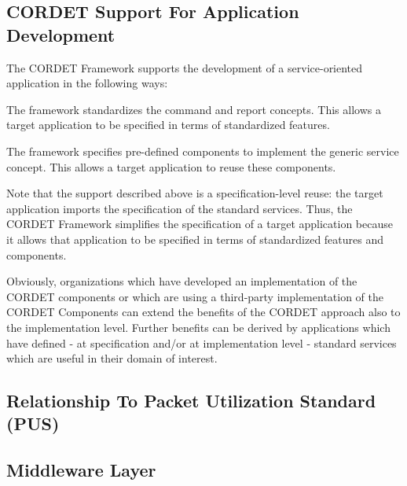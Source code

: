 \documentclass[a4paper,10pt]{article}
\newenvironment{fw_enumerate}					%
{\begin{enumerate}
  \setlength{\itemsep}{1mm}
  \setlength{\parskip}{0pt}
  \setlength{\parsep}{0pt}}
{\end{enumerate}}
\begin{document}
\subsection{CORDET Support For Application Development}\label{sec:CrSupportForAppDev} 

The CORDET Framework supports the development of a service-oriented application in the following ways:

\begin{fw_enumerate}
\item{} The framework standardizes the command and report concepts. 
This allows a target application to be specified in terms of standardized features.  
\item{} The framework specifies pre-defined components to implement the generic service concept. 
This allows a target application to reuse these components.  
\end{fw_enumerate}

Note that the support described above is a specification-level reuse: the target application imports the specification of the standard services. 
Thus, the CORDET Framework simplifies the specification of a target application because it allows that application to be specified in terms of standardized features and components.

Obviously, organizations which have developed an implementation of the CORDET components or which are using a third-party implementation of the CORDET Components can extend the benefits of the CORDET approach also to the implementation level. Further benefits can be derived by applications which have defined - at specification and/or at implementation level - standard services which are useful in their domain of interest.

\subsection{Relationship To Packet Utilization Standard (PUS)}\label{sec:RelationshipToPUS}


\subsection{Middleware Layer}\label{sec:MwLayer} 

\end{document}
